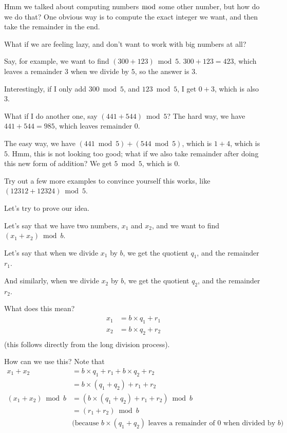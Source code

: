 \documentclass{article}
\begin{document}
Hmm we talked about computing numbers $\bmod$ some other number, but how do
we do that?
One obvious way is to compute the exact integer we want, and then take the remainder
in the end.

What if we are feeling lazy, and don't want to work with big numbers at all?

Say, for example, we want to find $\left(300 + 123\right) \bmod 5$.
$300 + 123 = 423$, which leaves a remainder $3$ when we divide by $5$, 
so the answer is $3$.

Interestingly, if I only add $300 \bmod 5$, and $123 \bmod 5$, I get
$0 + 3$, which is also $3$.

What if I do another one, say $\left(441 + 544\right) \bmod 5$?
The hard way, we have $441 + 544 = 985$, which leaves remainder $0$.

The easy way, we have $\left(441 \bmod 5\right) + \left(544 \bmod 5\right)$,
which is $1 + 4$, which is $5$.
Hmm, this is not looking too good; what if we also take remainder
after doing this new form of addition? We get $5 \bmod 5$, which is $0$.

Try out a few more examples to convince yourself this works, 
like $\left(12312 + 12324\right) \bmod 5$.

Let's try to prove our idea.

\vspace{1em}

Let's say that we have two numbers, $x_1$ and $x_2$, and we want to find
$\left(x_1 + x_2\right) \bmod b$.

Let's say that when we divide $x_1$ by $b$, we get the quotient $q_1$, 
and the remainder $r_1$.

And similarly, when we divide $x_2$ by $b$, we get the quotient $q_2$,
and the remainder $r_2$.

What does this mean?
\begin{align*}
	x_1 &= b\times q_1 + r_1\\
	x_2 &= b\times q_2 + r_2\\
\end{align*}
(this follows directly from the long division process).

How can we use this?
Note that
\begin{align*}
	x_1 + x_2 &=
		b\times q_1 + r_1 + b\times q_2 + r_2\\
		&= b\times\left(q_1 + q_2\right) + r_1 + r_2\\
	\left(x_1 + x_2\right) \bmod b &=
		\left(b\times\left(q_1 + q_2\right) + r_1 + r_2\right) \bmod b\\
		&= \left(r_1 + r_2\right) \bmod b\\
		&\text{(because $b \times\left(q_1 + q_2\right)$ leaves a remainder
		of $0$ when divided by $b$)}\\
\end{align*}
\end{document}
